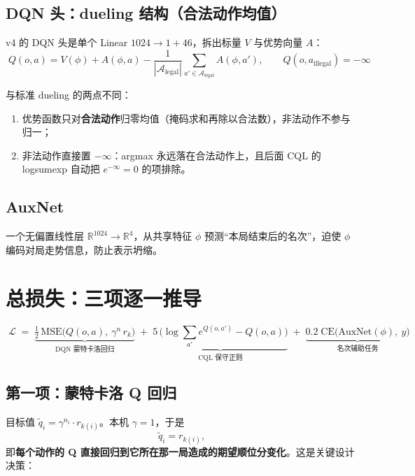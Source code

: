 \documentclass[11pt,a4paper]{ctexart}
\newcommand{\R}{\mathbb{R}}
\theoremstyle{remark}
\begin{document}
\subsection{DQN 头：dueling 结构（合法动作均值）}

v4 的 DQN 头是单个 Linear $1024 \to 1 + 46$，拆出标量 $V$ 与优势向量 $A$：
\[
\boxed{\;Q(o, a) = V(\phi) + A(\phi, a) - \frac{1}{|\mathcal{A}_{\text{legal}}|}\sum_{a' \in \mathcal{A}_{\text{legal}}} A(\phi, a'),\qquad Q(o, a_{\text{illegal}}) = -\infty\;}
\]

与标准 dueling 的两点不同：
\begin{enumerate}[leftmargin=2em, label=(\arabic*)]
  \item 优势函数只对\textbf{合法动作}归零均值（掩码求和再除以合法数），非法动作不参与归一；
  \item 非法动作直接置 $-\infty$：argmax 永远落在合法动作上，且后面 CQL 的 logsumexp 自动把 $e^{-\infty}=0$ 的项排除。
\end{enumerate}

\subsection{AuxNet}

一个无偏置线性层 $\R^{1024} \to \R^{4}$，从共享特征 $\phi$ 预测``本局结束后的名次''，迫使 $\phi$ 编码对局走势信息，防止表示坍缩。

\section{总损失：三项逐一推导}\label{sec:loss}

\[
\boxed{\;\mathcal{L} \;=\; \underbrace{\tfrac{1}{2}\,\mathrm{MSE}\big(Q(o,a),\ \gamma^{n}\, r_{k}\big)}_{\text{DQN 蒙特卡洛回归}} \;+\; \underbrace{5\,\Big(\log {\textstyle\sum_{a'}} e^{Q(o,a')} - Q(o,a)\Big)}_{\text{CQL 保守正则}} \;+\; \underbrace{0.2\;\mathrm{CE}\big(\mathrm{AuxNet}(\phi),\ y\big)}_{\text{名次辅助任务}}\;}
\]

\subsection{第一项：蒙特卡洛 Q 回归}

目标值 $\tilde{q}_i = \gamma^{n_i} \cdot r_{k(i)}$。本机 $\gamma = 1$，于是
\[
\tilde{q}_i = r_{k(i)},
\]
即\textbf{每个动作的 Q 直接回归到它所在那一局造成的期望顺位分变化}。这是关键设计决策：
\end{document}
